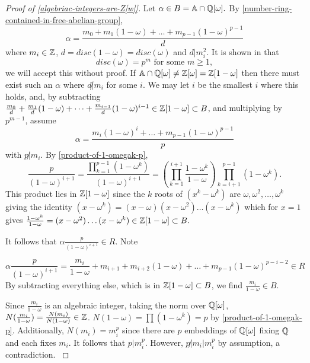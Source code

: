 \begin{proof}[Proof of \cref{algebriac-integers-are-Z[w]}]

Let $\alpha\in B=\mathbb{A}\cap\mathbb{Q}[\omega].$ By \cref{number-ring-contained-in-free-abelian-group}, 
$$\alpha=\frac{m_0+m_1(1-\omega)+\dots+m_{p-1}(1-\omega)^{p-1}}{d}$$ where $m_i\in \mathbb{Z}$, $d=disc(1-\omega)=disc(\omega)$ and $d|m_i^2$. It is shown in \cite{NumberFields} that $$disc(\omega)=p^m \text{ for some } m\geq 1,$$ we will accept this without proof. If $\mathbb{A}\cap\mathbb{Q}[\omega]\neq \mathbb{Z}[\omega]=\mathbb{Z}[1-\omega]$ then there must exist such an $\alpha$ where $d\not | m_i$ for some $i$. We may let $i$ be the smallest $i$ where this holds, and, by subtracting $\frac{m_0}{d}+\frac{m_1}{d}(1-\omega)+\dots+\frac{m_{i-1}}{d}(1-\omega)^{i-1}\in \mathbb{Z}[1-\omega]\subset B$, and multiplying by $p^{m-1}$, assume $$\alpha=\frac{m_i(1-\omega)^i+\dots+m_{p-1}(1-\omega)^{p-1}}{p}$$ with $p\not | m_i$. By \cref{product-of-1-omegak-p}, $$\frac{p}{(1-\omega)^{i+1}}=\frac{\prod_{k=1}^{p-1} (1-\omega^k)}{(1-\omega)^{i+1}}=(\prod_{k=1}^{i+1}\frac{1-\omega^k}{1-\omega})\prod_{k=i+1}^{p-1}(1-\omega^k).$$
This product lies in $\mathbb{Z}[1-\omega]$ since the $k$ roots of $(x^k-\omega^k)$ are $\omega,\omega^2,\dots,\omega^k$ giving the identity $(x-\omega^k)=(x-\omega)(x-\omega^2)\dots(x-\omega^k)$ which for $x=1$ gives $\frac{1-\omega^k}{1-\omega}=(x-\omega^2)\dots(x-\omega^k)\in \mathbb{Z}[1-\omega]\subset B.$

It follows that $\alpha \frac{p}{(1-\omega)^{i+1}}\in R.$ Note

$$\alpha \frac{p}{(1-\omega)^{i+1}}=\frac{m_i}{1-\omega}+m_{i+1}+m_{i+2}(1-\omega)+\dots+m_{p-1}(1-\omega)^{p-i-2}\in R$$
By subtracting everything else, which is in $\mathbb{Z}[1-\omega]\subset B$, we find $\frac{m_i}{1-\omega}\in B$.

Since $\frac{m_i}{1-\omega}$ is an algebraic integer, taking the norm over $\mathbb{Q}[\omega]$, $N(\frac{m_i}{1-\omega})=\frac{N(m_i)}{N(1-\omega)}\in \mathbb{Z}$. $N(1-\omega)=\prod(1-\omega^k)=p$ by \cref{product-of-1-omegak-p}. Additionally, $N(m_i)=m_i^p$ since there are $p$ embeddings of $\mathbb{Q}[\omega]$ fixing $\mathbb{Q}$ and each fixes $m_i$. It follows that $p|m_i^p$. However, $p\not | m_i | m_i^p$ by assumption, a contradiction. \cite{NumberFields}
\end{proof}


